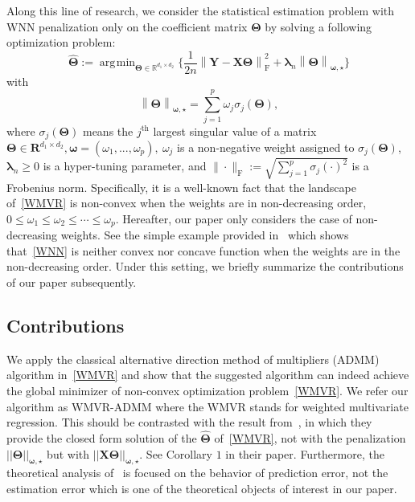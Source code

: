 \documentclass[alpha-refs]{wiley-article}
\DeclareMathOperator*{\argmin}{\arg\!\min}
\begin{document}
Along this line of research, we consider the statistical estimation problem with WNN penalization only on the coefficient matrix $\boldsymbol{\Theta}$ by solving a following optimization problem:
\begin{equation}  \label{WMVR}
    \widehat{\boldsymbol{\Theta}} := \argmin_{\boldsymbol{\Theta}\in\mathbb{R}^{d_{1}\times d_{2}}} \bigg\{ \frac{1}{2n} \left\| \boldsymbol{Y}-\boldsymbol{X}\boldsymbol{\Theta} \right\|_{\text{F}}^{2} + \boldsymbol{\lambda}_{n} \left\| \boldsymbol{\Theta}\right\|_{\boldsymbol{\omega,\star}} \bigg\}
\end{equation}
with 
\begin{equation} \label{WNN}
     \left\| \boldsymbol{\Theta} \right\|_{\boldsymbol{\omega,\star}} =\sum^{p}_{j=1} \omega_{j}\sigma_{j}(\boldsymbol{\Theta}),
\end{equation}
where $\sigma_{j}(\boldsymbol{\Theta})$ means the $j^{\text{th}}$ largest singular value of a matrix $\boldsymbol{\Theta} \in \boldsymbol{R}^{d_{1} \times d_{2}}, \boldsymbol{\omega} = (\omega_{1}, ..., \omega_{p}),\ \omega_{j}$ is a non-negative weight assigned to $\sigma_{j}(\boldsymbol{\Theta})$, $\boldsymbol{\lambda}_{n}\geq 0$ is a hyper-tuning parameter, and $\| \cdot \|_{\text{F}}:=\sqrt{\sum_{j=1}^{p}\sigma_{j}(\cdot)^{2}}$ is a Frobenius norm.
Specifically, it is a well-known fact that the landscape of~\eqref{WMVR} is non-convex when the weights are in non-decreasing order, $0\leq\omega_{1}\leq\omega_{2}\leq\cdots\leq\omega_{p}$. 
Hereafter, our paper only considers the case of non-decreasing weights.
See the simple example provided in~\citet{chen2013reduced} which shows that~\eqref{WNN} is neither convex nor concave function when the weights are in the non-decreasing order.
Under this setting, we briefly summarize the contributions of our paper subsequently.

\subsection{Contributions}
We apply the classical alternative direction method of multipliers (ADMM) algorithm in~\eqref{WMVR} and show that the suggested algorithm can indeed achieve the global minimizer of non-convex optimization problem~\eqref{WMVR}.
We refer our algorithm as WMVR-ADMM where the WMVR stands for weighted multivariate regression.
This should be contrasted with the result from~\citet{chen2013reduced}, in which they provide the closed form solution of the 
$\widehat{\boldsymbol{\Theta}}$ of~\eqref{WMVR}, not with the penalization $||\boldsymbol{\Theta}||_{\boldsymbol{\omega,\star}}$ but 
with $||\boldsymbol{X\Theta}||_{\boldsymbol{\omega,\star}}$.
See Corollary $1$ in their paper.
Furthermore, the theoretical analysis of~\citet{chen2013reduced} is focused on the behavior of prediction error, not the estimation error which is one of the theoretical objects of interest in our paper.
\end{document}
